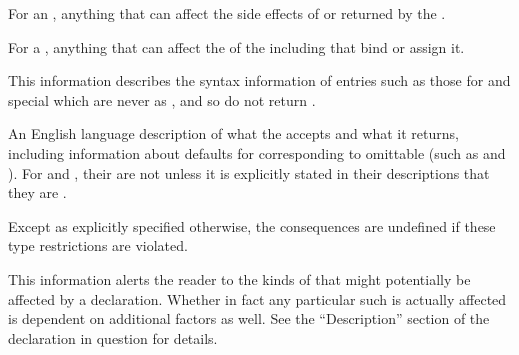 
For an , anything that can affect the side effects of
or  returned by the .

For a , anything that can affect the  of the 
including  that bind or assign it.

\endsubsubsection%


This information describes the syntax information of entries such as those for
 and special  which are never 
as , and so do not return .

\endsubsubsection%


An English language description of what  the  accepts
and what  it returns, including information about defaults for 
corresponding to omittable 
(such as  and ).
For  and ,
their  are not  unless it is explicitly stated in their
descriptions that they are .

Except as explicitly specified otherwise,
the consequences are undefined if these type restrictions are violated.

\endsubsubsection%


This information alerts the reader to the kinds of  that might 
potentially be affected by a declaration.  Whether in fact any particular such
 is actually affected is dependent on additional factors as well.
See the ``Description'' section of the declaration in question for details.

